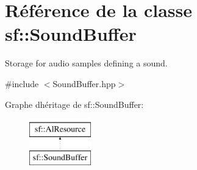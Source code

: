 \hypertarget{classsf_1_1SoundBuffer}{}\section{Référence de la classe sf\+:\+:Sound\+Buffer}
\label{classsf_1_1SoundBuffer}


Storage for audio samples defining a sound.  




{\ttfamily \#include $<$Sound\+Buffer.\+hpp$>$}

Graphe d\textquotesingle{}héritage de sf\+:\+:Sound\+Buffer\+:\begin{figure}[H]
\begin{center}
\leavevmode
\includegraphics[height=2.000000cm]{classsf_1_1SoundBuffer}
\end{center}
\end{figure}
